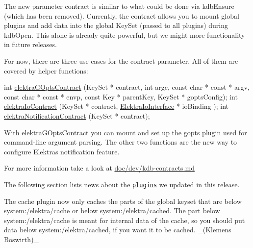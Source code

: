 The new parameter {\ttfamily contract} is similar to what could be done via {\ttfamily kdb\+Ensure} (which has been removed). Currently, the contract allows you to mount global plugins and add data into the global Key\+Set (passed to all plugins) during {\ttfamily kdb\+Open}. This alone is already quite powerful, but we might more functionality in future releases.

For now, there are three use cases for the {\ttfamily contract} parameter. All of them are covered by helper functions\+:


\begin{DoxyCode}
\textcolor{keywordtype}{int} \hyperlink{contracts_8c_af4f606fc2179e917a10c77dab576d648}{elektraGOptsContract} (KeySet * contract, \textcolor{keywordtype}{int} argc, \textcolor{keyword}{const} \textcolor{keywordtype}{char} * \textcolor{keyword}{const} * argv, \textcolor{keyword}{const}
       \textcolor{keywordtype}{char} * \textcolor{keyword}{const} * envp, \textcolor{keyword}{const} Key * parentKey, KeySet * goptsConfig);
\textcolor{keywordtype}{int} \hyperlink{io_8c_ada55d27e2530c2b98f10956fe40bbcbc}{elektraIoContract} (KeySet * contract, \hyperlink{kdbio_8h_aabcd87b8c09d4d4c1033fc1baa417391}{ElektraIoInterface} * ioBinding
      );
\textcolor{keywordtype}{int} \hyperlink{notification_8c_ad9290f444f315d3eac3f7cfdaf4efcda}{elektraNotificationContract} (KeySet * contract);
\end{DoxyCode}


With {\ttfamily elektra\+G\+Opts\+Contract} you can mount and set up the {\ttfamily gopts} plugin used for command-\/line argument parsing. The other two functions are the new way to configure Elektra\textquotesingle{}s notification feature.

For more information take a look at \hyperlink{doc_dev_kdb-contracts_md}{doc/dev/kdb-\/contracts.md}

The following section lists news about the \href{https://www.libelektra.org/plugins/readme}{\tt plugins} we updated in this release.


\begin{DoxyItemize}
\item The {\ttfamily cache} plugin now only caches the parts of the global keyset that are below {\ttfamily system\+:/elektra/cache} or below {\ttfamily system\+:/elektra/cached}. The part below {\ttfamily system\+:/elektra/cache} is meant for internal data of the {\ttfamily cache}, so you should put data below {\ttfamily system\+:/elektra/cached}, if you want it to be cached. \+\_\+(Klemens Böswirth)\+\_\+
\end{DoxyItemize}


